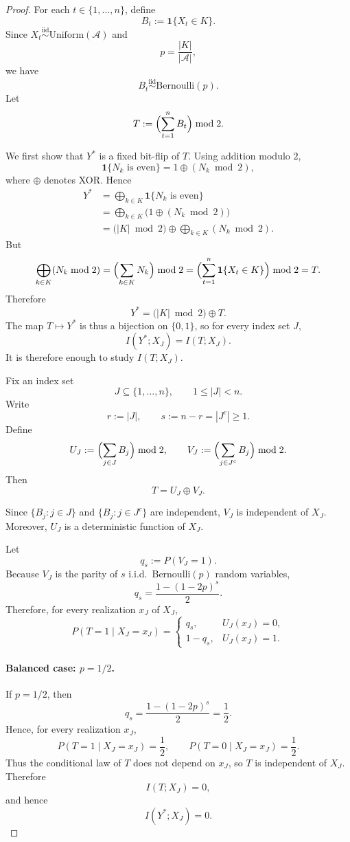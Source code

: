 \documentclass{article}
\theoremstyle{plain}
\theoremstyle{definition}
\theoremstyle{remark}
\begin{document}
\begin{proof}
For each \(t\in\{1,\ldots,n\}\), define
\[
B_t := \mathbf{1}\{X_t\in K\}.
\]
Since \(X_t \overset{\mathrm{iid}}{\sim} \mathrm{Uniform}(\mathcal A)\) and
\[
p = \frac{|K|}{|\mathcal A|},
\]
we have
\[
B_t \overset{\mathrm{iid}}{\sim} \mathrm{Bernoulli}(p).
\]
Let
\[
T := \Bigl(\sum_{t=1}^n B_t\Bigr)\bmod 2.
\]

We first show that \(Y^*\) is a fixed bit-flip of \(T\). Using addition modulo \(2\),
\[
\mathbf{1}\{N_k \text{ is even}\} = 1 \oplus (N_k \bmod 2),
\]
where \(\oplus\) denotes XOR. Hence
\begin{align*}
Y^*
&=
\bigoplus_{k\in K} \mathbf{1}\{N_k \text{ is even}\} \\
&=
\bigoplus_{k\in K} \bigl(1 \oplus (N_k \bmod 2)\bigr) \\
&=
\bigl(|K|\bmod 2\bigr)\oplus \bigoplus_{k\in K}(N_k \bmod 2).
\end{align*}
But
\[
\bigoplus_{k\in K}(N_k \bmod 2)
=
\Bigl(\sum_{k\in K} N_k\Bigr)\bmod 2
=
\Bigl(\sum_{t=1}^n \mathbf{1}\{X_t\in K\}\Bigr)\bmod 2
=
T.
\]
Therefore
\[
Y^* = \bigl(|K|\bmod 2\bigr)\oplus T.
\]
The map \(T\mapsto Y^*\) is thus a bijection on \(\{0,1\}\), so for every index set \(J\),
\[
I(Y^*;X_J)=I(T;X_J).
\]
It is therefore enough to study \(I(T;X_J)\).

Fix an index set
\[
J\subseteq \{1,\ldots,n\},
\qquad 1\le |J|<n.
\]
Write
\[
r := |J|,
\qquad
s := n-r = |J^c| \ge 1.
\]
Define
\[
U_J := \Bigl(\sum_{j\in J} B_j\Bigr)\bmod 2,
\qquad
V_J := \Bigl(\sum_{j\in J^c} B_j\Bigr)\bmod 2.
\]
Then
\[
T = U_J \oplus V_J.
\]

Since \(\{B_j : j\in J\}\) and \(\{B_j : j\in J^c\}\) are independent,
\(V_J\) is independent of \(X_J\). Moreover, \(U_J\) is a deterministic function of
\(X_J\).

Let
\[
q_s := P(V_J=1).
\]
Because \(V_J\) is the parity of \(s\) i.i.d.\ Bernoulli\((p)\) random variables,
\[
q_s = \frac{1-(1-2p)^s}{2}.
\]
Therefore, for every realization \(x_J\) of \(X_J\),
\[
P(T=1\mid X_J=x_J)
=
\begin{cases}
q_s, & U_J(x_J)=0,\\
1-q_s, & U_J(x_J)=1.
\end{cases}
\]

\paragraph{Balanced case: \(p=1/2\).}
If \(p=1/2\), then
\[
q_s = \frac{1-(1-2p)^s}{2} = \frac{1}{2}.
\]
Hence, for every realization \(x_J\),
\[
P(T=1\mid X_J=x_J)=\frac12,
\qquad
P(T=0\mid X_J=x_J)=\frac12.
\]
Thus the conditional law of \(T\) does not depend on \(x_J\), so \(T\) is independent
of \(X_J\). Therefore
\[
I(T;X_J)=0,
\]
and hence
\[
I(Y^*;X_J)=0.
\]


\end{proof}
\end{document}
